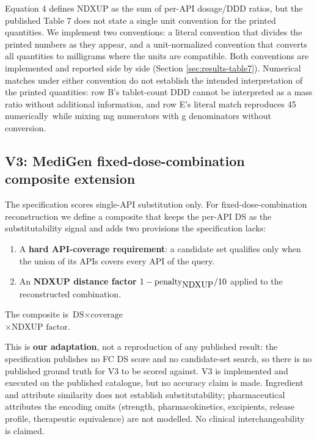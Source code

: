 \documentclass[a4paper]{elsarticle}
\begin{document}
Equation 4 defines NDXUP as the sum of per-API dosage/DDD ratios, but the published Table 7 does not state a single unit convention for the printed quantities. We implement two conventions: a literal convention that divides the printed numbers as they appear, and a unit-normalized convention that converts all quantities to milligrams where the units are compatible. Both conventions are implemented and reported side by side (Section \ref{sec:results-table7}). Numerical matches under either convention do not establish the intended interpretation of the printed quantities: row B's tablet-count DDD cannot be interpreted as a mass ratio without additional information, and row E's literal match reproduces 45 numerically~while mixing mg numerators with g denominators without conversion.

\subsection{V3: MediGen fixed-dose-combination composite extension}
\label{sec:v3}

The specification scores single-API substitution only. For fixed-dose-combination reconstruction we define a composite that keeps the per-API DS as the substitutability signal and adds two provisions the specification lacks:

\begin{enumerate}
\item A \textbf{hard API-coverage requirement}: a candidate set qualifies only when the union of its APIs covers every API of the query.
\item An \textbf{NDXUP distance factor} \linebreak[4]\mbox{$1 - \text{penalty}_{\hbox{NDXUP}}/10$} applied to the reconstructed combination.
\end{enumerate}

The composite is $\text{DS} \times \text{coverage}$ \\
$\times \text{NDXUP factor}$.

This is \textbf{our adaptation}, not a reproduction of any published result: the specification publishes no FC DS score and no candidate-set search, so there is no published ground truth for V3 to be scored against. V3 is implemented and executed on the published catalogue, but no accuracy claim is made. Ingredient and attribute similarity does not establish substitutability; pharmaceutical attributes the encoding omits (strength, pharmacokinetics, excipients, release profile, therapeutic equivalence) are not modelled. No clinical interchangeability is claimed.
\end{document}
